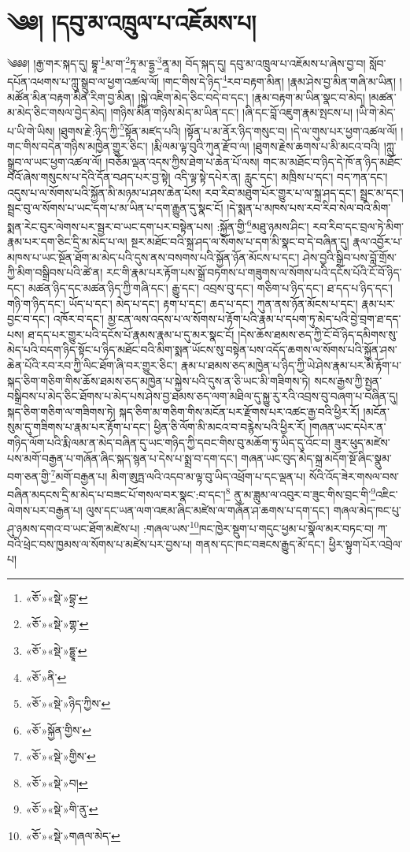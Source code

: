 \chapter{༄༅། །དབུ་མ་འཁྲུལ་པ་འཇོམས་པ།}༄༅༅། །རྒྱ་གར་སྐད་དུ། བྷཱ་\footnote{«ཅོ་»«སྡེ་»བྷྲ་}མ་ག་\footnote{«ཅོ་»«སྡེ་»གྷ་}ཏཱ་མ་དྷྱ་\footnote{«ཅོ་»«སྡེ་»དྷྱཱ་}ནཱ་མ། བོད་སྐད་དུ། དབུ་མ་འཁྲུལ་པ་འཇོམས་པ་ཞེས་བྱ་བ། སློབ་དཔོན་འཕགས་པ་ཀླུ་སྒྲུབ་ལ་ཕྱག་འཚལ་ལོ། །གང་གིས་དེ་ཉིད་\footnote{«ཅོ་»ནི་}རབ་བརྟག་མིན། །རྣམ་ཤེས་བྱ་མིན་གཞི་མ་ཡིན། །མཚོན་མིན་བརྟག་མིན་རིག་བྱ་མིན། །སྐྱེ་འཇིག་མེད་ཅིང་བདེ་བ་དང་། །རྣམ་བརྟག་མ་ཡིན་སྣང་བ་མེད། །མཚན་མ་མེད་ཅིང་གསལ་བྱེད་མེད། །གཉིས་མིན་གཉིས་མེད་མ་ཡིན་དང་། །ཞི་དང་བློ་འཇུག་རྣམ་སྤངས་པ། །ཡི་གེ་མེད་པ་ཡི་གེ་ཡིས། །ཐུགས་རྗེ་:ཉིད་ཀྱི་\footnote{«ཅོ་»«སྡེ་»ཉིད་ཀྱིས་}སྟོན་མཛད་པའི། །སྟོན་པ་མ་ནོར་ཉིད་གསུང་བ། །དེ་ལ་གུས་པར་ཕྱག་འཚལ་ལོ། །གང་གིས་བདེན་གཉིས་མཁྱེན་གྱུར་ཅིང་། །རྨི་ལམ་ལྟ་བུའི་ཀུན་རྫོབ་ལ། །ཐུགས་རྗེས་ཆགས་པ་མི་མངའ་བའི། །ཀླུ་སྒྲུབ་ལ་ཡང་ཕྱག་འཚལ་ལོ། །བཅོམ་ལྡན་འདས་ཀྱིས་ཐེག་པ་ཆེན་པོ་ལས། གང་མ་མཐོང་བ་ཉིད་དེ་ཁོ་ན་ཉིད་མཐོང་བའོ་ཞེས་གསུངས་པ་དེའི་དོན་བཤད་པར་བྱ་སྟེ། འདི་ལྟ་སྟེ་དཔེར་ན། རླུང་དང་། མཁྲིས་པ་དང་། བད་ཀན་དང་། འདུས་པ་ལ་སོགས་པའི་སྐྱོན་མི་མཉམ་པ་ཤས་ཆེན་པོས། རབ་རིབ་མཐུག་པོར་གྱུར་པ་ལ་སྐྲ་ཤད་དང་། སྦྲང་མ་དང་། སྦྲང་བུ་ལ་སོགས་པ་ཡང་དག་པ་མ་ཡིན་པ་དག་རྒྱུན་དུ་སྣང་ངོ། །དེ་སྨན་པ་མཁས་པས་རབ་རིབ་སེལ་བའི་མིག་སྨན་རེང་བུར་ལེགས་པར་སྦྱར་བ་ཡང་དག་པར་བསྟེན་པས། :སྐྱོན་གྱི་\footnote{«ཅོ་»སྐྱོན་གྱིས་}མཐུ་ཉམས་ཤིང་། རབ་རིབ་དང་བྲལ་ཏེ་མིག་རྣམ་པར་དག་ཅིང་དྲི་མ་མེད་པ་ལ། སྔར་མཐོང་བའི་སྐྲ་ཤད་ལ་སོགས་པ་དག་མི་སྣང་བ་དེ་བཞིན་དུ། རྣལ་འབྱོར་པ་མཁས་པ་ཡང་སྔོན་ཐོག་མ་མེད་པའི་དུས་ནས་བསགས་པའི་སྐྱོན་ཉོན་མོངས་པ་དང་། ཤེས་བྱའི་སྒྲིབ་པས་བློ་གྲོས་ཀྱི་མིག་བསྒྲིབས་པའི་ཚེ་ན། རང་གི་རྣམ་པར་རྟོག་པས་སྒྲོ་བཏགས་པ་གཟུགས་ལ་སོགས་པའི་དངོས་པོའི་ངོ་བོ་ཉིད་དང་། མཚན་ཉིད་དང་མཚན་ཉིད་ཀྱི་གཞི་དང་། རྒྱུ་དང་། འབྲས་བུ་དང་། གཅིག་པ་ཉིད་དང་། ཐ་དད་པ་ཉིད་དང་། གཉི་ག་ཉིད་དང་། ཡོད་པ་དང་། མེད་པ་དང་། རྟག་པ་དང་། ཆད་པ་དང་། ཀུན་ནས་ཉོན་མོངས་པ་དང་། རྣམ་པར་བྱང་བ་དང་། འཁོར་བ་དང་། མྱ་ངན་ལས་འདས་པ་ལ་སོགས་པ་རྟོག་པའི་རྣམ་པ་དཔག་ཏུ་མེད་པའི་བྱེ་བྲག་ཐ་དད་པས། ཐ་དད་པར་གྱུར་པའི་དངོས་པོ་རྣམས་རྣམ་པ་དུ་མར་སྣང་ངོ། །དེས་ཆོས་ཐམས་ཅད་ཀྱི་ངོ་བོ་ཉིད་དམིགས་སུ་མེད་པའི་བདག་ཉིད་སྟོང་པ་ཉིད་མཐོང་བའི་མིག་སྨན་ཡོངས་སུ་བསྟེན་པས་འདོད་ཆགས་ལ་སོགས་པའི་སྐྱོན་ཤས་ཆེན་པོའི་རབ་རབ་ཀྱི་ལིང་ཐོག་ཞི་བར་གྱུར་ཅིང་། རྣམ་པ་ཐམས་ཅད་མཁྱེན་པ་ཉིད་ཀྱི་ཡེ་ཤེས་རྣམ་པར་མི་རྟོག་པ་སྐད་ཅིག་གཅིག་གིས་ཆོས་ཐམས་ཅད་མཁྱེན་པ་སྐྱེས་པའི་དུས་ན་ཅི་ཡང་མི་གཟིགས་ཏེ། སངས་རྒྱས་ཀྱི་སྤྱན་བསྒྲིབས་པ་མེད་ཅིང་ཐོགས་པ་མེད་པས་ཤེས་བྱ་ཐམས་ཅད་ལག་མཐིལ་དུ་སྐྱུ་རུ་རའི་འབྲས་བུ་བཞག་པ་བཞིན་དུ། སྐད་ཅིག་གཅིག་ལ་གཟིགས་ཏེ། སྐད་ཅིག་མ་གཅིག་གིས་མངོན་པར་རྫོགས་པར་འཚང་རྒྱ་བའི་ཕྱིར་རོ། །མངོན་སུམ་དུ་གཟིགས་པ་རྣམ་པར་རྟོག་པ་དང་། ཕྱིན་ཅི་ལོག་མི་མངའ་བ་བརྙེས་པའི་ཕྱིར་རོ། །གཞན་ཡང་དཔེར་ན་གཉིད་ལོག་པའི་རྨི་ལམ་ན་མེད་བཞིན་དུ་ཡང་གཉིད་ཀྱི་དབང་གིས་བུ་མཆོག་ཏུ་ཡིད་དུ་འོང་བ། ཟུར་ཕུད་མཛེས་པས་མགོ་བརྒྱན་པ་གཞོན་ཞིང་སྐད་སྙན་པ་དེས་པ་སྨྲ་བ་དག་དང་། གཞན་ཡང་བུད་མེད་སྐྲ་མདོག་སྔོ་ཞིང་སྣུམ་བག་ཅན་གྱི་\footnote{«ཅོ་»«སྡེ་»གྱིས་}མགོ་བརྒྱན་པ། མིག་ཨུཏྤ་ལའི་འདབ་མ་ལྟ་བུ་ཡིད་འཕྲོག་པ་དང་ལྡན་པ། སོའི་འོད་ཟེར་གསལ་བས་བཞིན་མདངས་དྲི་མ་མེད་པ་བཟང་པོ་གསལ་བར་སྣང་:བ་དང་།\footnote{«ཅོ་»«སྡེ་»བ།} ནུ་མ་ཟླུམ་ལ་འབུར་བ་ཟུང་གིས་བྲང་གི་\footnote{«ཅོ་»«སྡེ་»གི་ནུ་}འཇིང་ལེགས་པར་བརྒྱན་པ། ལུས་དང་ཡན་ལག་འཇམ་ཞིང་མཛེས་ལ་གཞོན་ཤ་ཆགས་པ་དག་དང་། གཞལ་མེད་ཁང་པུ་ཤུ་ཉམས་དགའ་བ་ཡང་ཐོག་མཛེས་པ། :གཞལ་ཡས་\footnote{«ཅོ་»«སྡེ་»གཞལ་མེད་}ཁང་ཁྱེར་སྡུག་པ་གདུང་ཕྱམ་པ་སྣོལ་མར་བཏང་བ། ཀ་བའི་ཕྲེང་བས་ཁྱམས་ལ་སོགས་པ་མཛེས་པར་བྱས་པ། གནས་དང་ཁང་བཟངས་རྒྱུད་མོ་དང་། ཕྱིར་སྟུག་པོར་འབྲེལ་པ། 